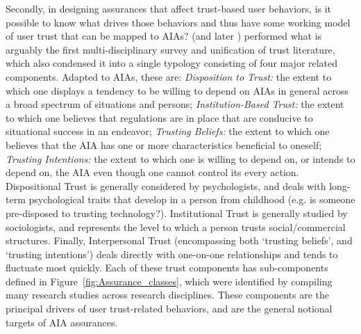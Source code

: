         Secondly, in designing assurances that affect trust-based user behaviors, is it possible to know what drives those behaviors and thus have some working model of user trust that can be mapped to AIAs? 
        \citet{McKnight1998-ty} (and later \cite{McKnight2001-fa}) performed what is arguably the first multi-disciplinary survey and unification of trust literature, which also condensed it into a single typology consisting of four major related components. 
%       
%
%
        Adapted to AIAs, these are: \textit{Disposition to Trust:} the extent to which one displays a tendency to be willing to depend on AIAs in general across a broad spectrum of situations and persons; \textit{Institution-Based Trust:} the extent to which one believes that regulations are in place that are conducive to situational success in an endeavor; \textit{Trusting Beliefs:} the extent to which one believes that the AIA has one or more characteristics beneficial to oneself; \textit{Trusting Intentions:} the extent to which one is willing to depend on, or intends to depend on, the AIA even though one cannot control its every action. 
        Dispositional Trust is generally considered by psychologists, and deals with long-term psychological traits that develop in a person from childhood (e.g. is someone pre-disposed to trusting technology?).  
        Institutional Trust %
        is generally studied by sociologists, and represents the level to which a person trusts social/commercial structures. 
        Finally, Interpersonal Trust (encompassing both `trusting beliefs', and `trusting intentions') deals directly with one-on-one relationships and tends to fluctuate most quickly. 
        Each of these trust components has sub-components defined in Figure~\ref{fig:Assurance_classes}, which were identified by compiling many research studies across research disciplines. 
        These components are the principal drivers of user trust-related behaviors, and are the general notional targets of AIA assurances.

